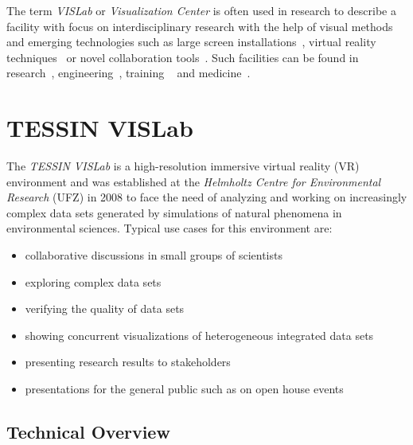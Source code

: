 \documentclass[twocolumn]{svjour3}          %
\begin{document}
The term \emph{VISLab} or \emph{Visualization Center} is often used in research to describe a facility with focus on interdisciplinary research with the help of visual methods and emerging technologies such as large screen installations~\cite{web:kaust}, virtual reality techniques~\cite{bryson:vr,burdea:vr} or novel collaboration tools~\cite{johnson:tele-immersivecollaboration}. Such facilities can be found in research~\cite{web:vr-science}, engineering~\cite{web:vr-engineering}, training ~\cite{seymour:vror} and medicine~\cite{web:vr-medicine}.

\section{TESSIN VISLab}
\label{tessin-vislab}

The \emph{TESSIN VISLab} is a high-resolution immersive virtual reality (VR) environment and was established at the \emph{Helmholtz Centre for Environmental Research} (UFZ) in 2008 to face the need of analyzing and working on increasingly complex data sets generated by simulations of natural phenomena in environmental sciences. Typical use cases for this environment are:

\begin{itemize}
\itemsep1pt\parskip0pt
\item
  collaborative discussions in small groups of scientists
\item
  exploring complex data sets
\item
  verifying the quality of data sets
\item
  showing concurrent visualizations of heterogeneous integrated data sets
\item
  presenting research results to stakeholders
\item
  presentations for the general public such as on open house events
\end{itemize}

\subsection{Technical Overview}
\label{technical-overview}
\end{document}

